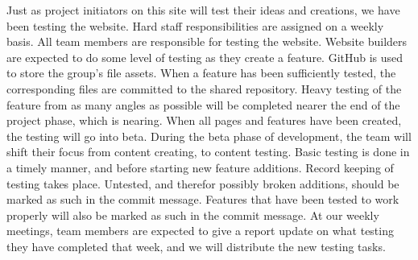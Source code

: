 \documentclass[12pt]{article}
\begin{document}
\begin{enumerate}
Just as project initiators on this site will test their ideas and creations, we have been testing the website. Hard staff responsibilities are assigned on a weekly basis. All team members are responsible for testing the website. Website builders are expected to do some level of testing as they create a feature. GitHub is used to store the group’s file assets. When a feature has been sufficiently tested, the corresponding files are committed to the shared repository. Heavy testing of the feature from as many angles as possible will be completed nearer the end of the project phase, which is nearing. When all pages and features have been created, the testing will go into beta. During the beta phase of development, the team will shift their focus from content creating, to content testing. Basic testing is done in a timely manner, and before starting new feature additions. Record keeping of testing takes place. Untested, and therefor possibly broken additions, should be marked as such in the commit message. Features that have been tested to work properly will also be marked as such in the commit message. At our weekly meetings, team members are expected to give a report update on what testing they have completed that week, and we will distribute the new testing tasks.\\

\end{enumerate}
\end{document}
